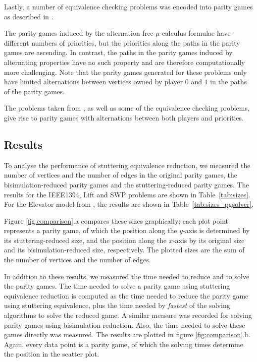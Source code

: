 \documentclass[a4paper]{llncs}
\newcommand{\even}{\ensuremath{0}\xspace}
\newcommand{\odd}{\ensuremath{1}\xspace}
\begin{document}
Lastly, a number of equivalence checking problems was encoded into parity games
as described in \cite{CPPW:07}.

The parity games induced by the alternation free $\mu$-calculus formulae
have different numbers of priorities, but the priorities along the
paths in the parity games are ascending. In contrast, the paths in the
parity games induced by alternating properties have no such property
and are therefore computationally more challenging. Note that the parity games
generated for these problems only have limited alternations between vertices
owned by player $\even$ and $\odd$ in the paths of the parity games.

The problems taken from \cite{FL:09}, as well as some of the equivalence
checking problems, give rise to parity games with alternations between both
players and priorities.

\subsection{Results}

To analyse the performance of stuttering equivalence reduction, we measured the
number of vertices and the number of edges in the original parity games, the
bisimulation-reduced parity games and the stuttering-reduced parity games. The
results for the IEEE1394, Lift and SWP problems are shown in Table~\ref{tab:sizes}.
For the Elevator model from \cite{FL:09}, the results are shown
in Table~\ref{tab:sizes_pgsolver}.

Figure \ref{fig:comparison}.a compares these sizes graphically; each plot point
represents a parity game, of which the position along the $y$-axis is determined
by its stuttering-reduced size, and the position along the $x$-axis by its 
original size and its bisimulation-reduced size, respectively. The plotted sizes
are the sum of the number of vertices and the number of edges.

In addition to these results, we measured the time needed to reduce and to solve
the parity games. The time needed to solve a parity game using stuttering 
equivalence reduction is computed as the time needed to reduce the parity game
using stuttering equivalence, plus the time needed by \emph{fastest} of the 
solving algorithms to solve the reduced game. A similar measure was recorded for
solving parity games using bisimulation reduction. Also, the time needed to 
solve these games directly was measured. The results are plotted in figure
\ref{fig:comparison}.b. Again, every data point is a parity game, of which the
solving times determine the position in the scatter plot.
\end{document}
